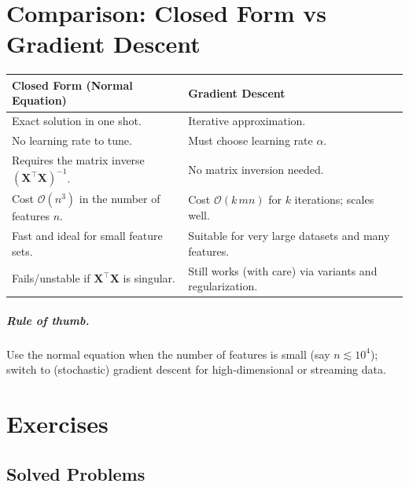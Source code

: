 \documentclass[11pt,a4paper]{report}
\theoremstyle{definition}
\theoremstyle{plain}
\theoremstyle{remark}
\newcommand{\Xmat}{\mathbf{X}}
\begin{document}
	\chapter{Comparison: Closed Form vs Gradient Descent}
	
	\begin{center}
		\renewcommand{\arraystretch}{1.25}
		\begin{tabular}{@{}p{5.4cm}p{5.4cm}@{}}
			\toprule
			\textbf{Closed Form (Normal Equation)} & \textbf{Gradient Descent}\\
			\midrule
			Exact solution in one shot.            & Iterative approximation.\\
			No learning rate to tune.              & Must choose learning rate $\alpha$.\\
			Requires the matrix inverse
			$(\Xmat^{\!\top}\Xmat)^{-1}$.           & No matrix inversion needed.\\
			Cost $\mathcal{O}(n^3)$ in the number
			of features $n$.                       & Cost $\mathcal{O}(k\,mn)$ for $k$
			iterations; scales well.\\
			Fast and ideal for small feature sets. & Suitable for very large datasets and
			many features.\\
			Fails/unstable if $\Xmat^{\!\top}\Xmat$
			is singular.                           & Still works (with care) via variants
			and regularization.\\
			\bottomrule
		\end{tabular}
	\end{center}
	
	\paragraph{Rule of thumb.} Use the normal equation when the number of features
	is small (say $n\lesssim 10^4$); switch to (stochastic) gradient descent for
	high-dimensional or streaming data.
	
	\chapter{Exercises}
	
	\section{Solved Problems}
	
\end{document}
